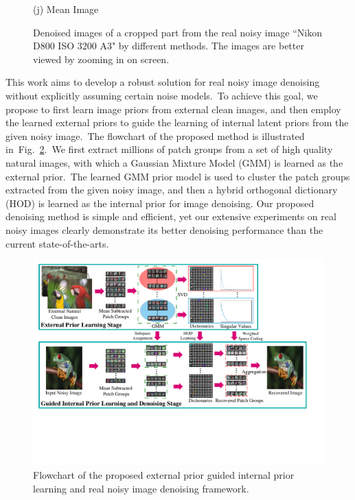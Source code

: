 \documentclass[10pt,twocolumn,letterpaper]{article}
\begin{document}
\begin{figure}
{\begin{minipage}[t]{0.195\textwidth}
{\footnotesize (j) Mean Image \cite{crosschannel2016} }
\end{minipage}
}\vspace{-1mm}
\caption{Denoised images of a cropped part from the real noisy image ``Nikon D800 ISO 3200 A3" \cite{crosschannel2016} by different methods. The images are better viewed by zooming in on screen.} 
\vspace{-3mm}
\label{fig1}
\end{figure}

This work aims to develop a robust solution for real noisy image denoising without explicitly assuming certain noise models.\ To achieve this goal, we propose to first learn image priors from external clean images, and then employ the learned external priors to guide the learning of internal latent priors from the given noisy image.\ The flowchart of the proposed method is illustrated in\ Fig.\ \ref{fig2}.\ We first extract millions of patch groups from a set of high quality natural images, with which a Gaussian Mixture Model (GMM) is learned as the external prior.\ The learned GMM prior model is used to cluster the patch groups extracted from the given noisy image, and then a hybrid orthogonal dictionary (HOD) is learned as the internal prior for image denoising. Our proposed denoising method is simple and efficient, yet our extensive experiments on real noisy images clearly demonstrate its better denoising performance than the current state-of-the-arts.

\begin{figure}\vspace{-2mm}
\centering
\includegraphics[width=0.79\linewidth]{Flowchart.pdf}
\vspace{-28mm}
\caption{Flowchart of the proposed external prior guided internal prior learning and real noisy image denoising framework.
}
\vspace{-2mm}
\label{fig2}
\end{figure}
\end{document}
